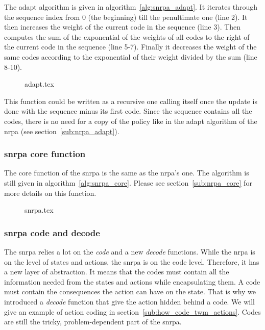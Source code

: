 The adapt algorithm is given in algorithm~\ref{alg:snrpa_adapt}.
It iterates through the sequence index from 0 (the beginning) till the penultimate one (line 2).
It then increases the weight of the current code in the sequence (line 3).
Then computes the sum of the exponential of the weights of all codes to the right of the current code in the sequence (line 5-7).
Finally it decreases the weight of the same codes according to the exponential of their weight divided by the sum (line 8-10).

\begin{figure}[htpb]
    \centering
    \begin{minipage}{.7\linewidth}
        {adapt.tex}
    \end{minipage}
\end{figure}

This function could be written as a recursive one calling itself once the update is done with the sequence minus its first code.
Since the sequence contains all the codes, there is no need for a copy of the policy like in the adapt algorithm of the \gls{nrpa} (see section~\ref{sub:nrpa_adapt}).

\subsubsection{\acrshort{snrpa} core function}%
\label{ssub:snrpa_core_function}

The core function of the \gls{snrpa} is the same as the \gls{nrpa}'s one.
The algorithm is still given in algorithm~\ref{alg:snrpa_core}.
Please see section~\ref{sub:nrpa_core} for more details on this function.

\begin{figure}[htpb]
    \centering
    \begin{minipage}{.7\linewidth}
        {snrpa.tex}
    \end{minipage}
\end{figure}

\subsubsection{\acrshort{snrpa} code and decode}%
\label{ssub:snrpa_code_decode}

The \gls{snrpa} relies a lot on the \textit{code} and a new \textit{decode} functions.
While the \gls{nrpa} is on the level of states and actions, the \gls{snrpa} is on the code level.
Therefore, it has a new layer of abstraction.
It means that the codes must contain all the information needed from the states and actions while encapsulating them.
A code must contain the consequences the action can have on the state.
That is why we introduced a \textit{decode} function that give the action hidden behind a code.
We will give an example of action coding in section~\ref{sub:how_code_twm_actions}.
Codes are still the tricky, problem-dependent part of the \gls{snrpa}.

